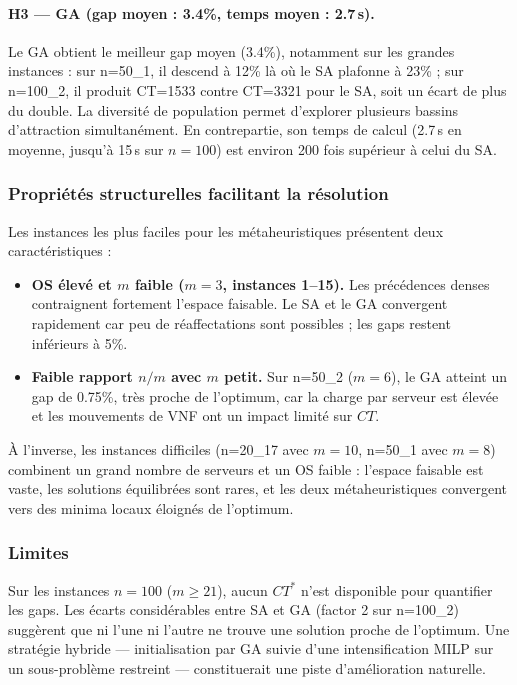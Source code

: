 \documentclass{article}
\begin{document}
\paragraph{H3 --- GA (gap moyen : 3.4\%, temps moyen : 2.7\,s).}
Le GA obtient le meilleur gap moyen (3.4\%), notamment sur les grandes instances :
sur n=50\_1, il descend à 12\% là où le SA plafonne à 23\% ; sur n=100\_2, il
produit CT=1533 contre CT=3321 pour le SA, soit un écart de plus du double.
La diversité de population permet d'explorer plusieurs bassins d'attraction
simultanément. En contrepartie, son temps de calcul (2.7\,s en moyenne,
jusqu'à 15\,s sur $n=100$) est environ 200 fois supérieur à celui du SA.

\subsubsection{Propriétés structurelles facilitant la résolution}

Les instances les plus faciles pour les métaheuristiques présentent deux
caractéristiques :
\begin{itemize}
  \item \textbf{OS élevé et $m$ faible ($m=3$, instances 1--15).} Les précédences
    denses contraignent fortement l'espace faisable. Le SA et le GA convergent
    rapidement car peu de réaffectations sont possibles ; les gaps restent
    inférieurs à 5\%.
  \item \textbf{Faible rapport $n/m$ avec $m$ petit.} Sur n=50\_2 ($m=6$),
    le GA atteint un gap de 0.75\%, très proche de l'optimum, car la charge
    par serveur est élevée et les mouvements de VNF ont un impact limité sur
    $CT$.
\end{itemize}
À l'inverse, les instances difficiles (n=20\_17 avec $m=10$, n=50\_1 avec
$m=8$) combinent un grand nombre de serveurs et un OS faible : l'espace
faisable est vaste, les solutions équilibrées sont rares, et les deux
métaheuristiques convergent vers des minima locaux éloignés de l'optimum.

\subsubsection{Limites}

Sur les instances $n=100$ ($m \ge 21$), aucun $CT^*$ n'est disponible pour
quantifier les gaps. Les écarts considérables entre SA et GA (factor 2 sur
n=100\_2) suggèrent que ni l'une ni l'autre ne trouve une solution proche de
l'optimum. Une stratégie hybride --- initialisation par GA suivie d'une
intensification MILP sur un sous-problème restreint --- constituerait une
piste d'amélioration naturelle.
\end{document}
